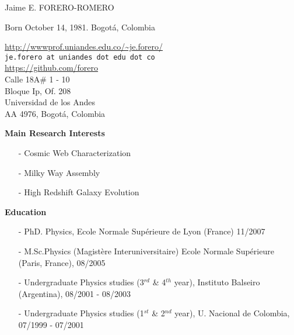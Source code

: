 \documentclass[letterpaper,11pt,onecolumn]{article}
\begin{document}
\noindent

\noindent
{{\Large Jaime E. FORERO-ROMERO}}\\
\begin{flushleft}
Born October 14, 1981. Bogot\'a, Colombia\\
\end{flushleft}
\begin{flushright}
\url{http://wwwprof.uniandes.edu.co/~je.forero/} \\{\tt{je.forero at uniandes dot edu dot co}}\\
\url{https://github.com/forero}\\
Calle 18A\# 1 - 10\\
Bloque Ip, Of. 208\\
Universidad de los Andes\\
AA 4976, Bogot\'a, Colombia\\
\end{flushright}


{\bf Main Research Interests}
\begin{itemize}
\item[-]{Cosmic Web Characterization}
\item[-]{Milky Way Assembly}
\item[-]{High Redshift Galaxy Evolution}
\end{itemize}

{\bf Education}
\indent
\begin{itemize}
\item[-] PhD. Physics, Ecole Normale Sup\'erieure de Lyon (France) 11/2007
\item[-] M.Sc.Physics (Magist\`ere Interuniversitaire)  Ecole Normale
  Sup\'erieure (Paris, France), 08/2005
\item[-] Undergraduate Physics studies (3$^{rd}$ \& 4$^{th}$ year),
  Instituto Balseiro (Argentina), 08/2001 - 08/2003
\item[-] Undergraduate Physics studies (1$^{st}$ \& 2$^{nd}$ year),
  U. Nacional de Colombia, 07/1999 -  07/2001
\end{itemize}
\end{document}
